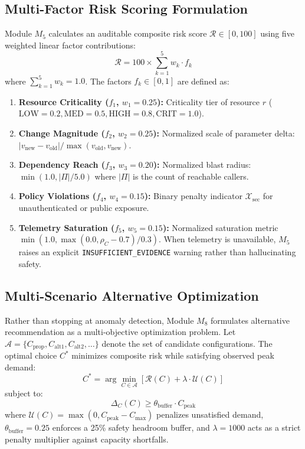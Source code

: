 \documentclass[conference]{IEEEtran}
\begin{document}
\subsection{Multi-Factor Risk Scoring Formulation}
Module $M_5$ calculates an auditable composite risk score $\mathcal{R} \in [0, 100]$ using five weighted linear factor contributions:
\begin{equation}
\mathcal{R} = 100 \times \sum_{k=1}^5 w_k \cdot f_k
\label{eq:risk}
\end{equation}
where $\sum_{k=1}^5 w_k = 1.0$. The factors $f_k \in [0, 1]$ are defined as:
\begin{enumerate}
    \item \textbf{Resource Criticality ($f_1$, $w_1 = 0.25$):} Criticality tier of resource $r$ ($\text{LOW}=0.2, \text{MED}=0.5, \text{HIGH}=0.8, \text{CRIT}=1.0$).
    \item \textbf{Change Magnitude ($f_2$, $w_2 = 0.25$):} Normalized scale of parameter delta: $|v_{\text{new}} - v_{\text{old}}| / \max(v_{\text{old}}, v_{\text{new}})$.
    \item \textbf{Dependency Reach ($f_3$, $w_3 = 0.20$):} Normalized blast radius: $\min(1.0, |\Pi| / 5.0)$ where $|\Pi|$ is the count of reachable callers.
    \item \textbf{Policy Violations ($f_4$, $w_4 = 0.15$):} Binary penalty indicator $\mathcal{X}_{\text{sec}}$ for unauthenticated or public exposure.
    \item \textbf{Telemetry Saturation ($f_5$, $w_5 = 0.15$):} Normalized saturation metric $\min(1.0, \max(0.0, \rho_C - 0.7) / 0.3)$. When telemetry is unavailable, $M_5$ raises an explicit \texttt{INSUFFICIENT\_EVIDENCE} warning rather than hallucinating safety.
\end{enumerate}

\subsection{Multi-Scenario Alternative Optimization}
Rather than stopping at anomaly detection, Module $M_8$ formulates alternative recommendation as a multi-objective optimization problem. Let $\mathcal{A} = \{C_{\text{prop}}, C_{\text{alt1}}, C_{\text{alt2}}, \dots\}$ denote the set of candidate configurations. The optimal choice $C^*$ minimizes composite risk while satisfying observed peak demand:
\begin{equation}
C^* = \arg\min_{C \in \mathcal{A}} \left[ \mathcal{R}(C) + \lambda \cdot \mathcal{U}(C) \right]
\end{equation}
subject to:
\begin{equation}
\Delta_C(C) \ge \theta_{\text{buffer}} \cdot C_{\text{peak}}
\end{equation}
where $\mathcal{U}(C) = \max(0, C_{\text{peak}} - C_{\max})$ penalizes unsatisfied demand, $\theta_{\text{buffer}} = 0.25$ enforces a 25\% safety headroom buffer, and $\lambda = 1000$ acts as a strict penalty multiplier against capacity shortfalls.
\end{document}
